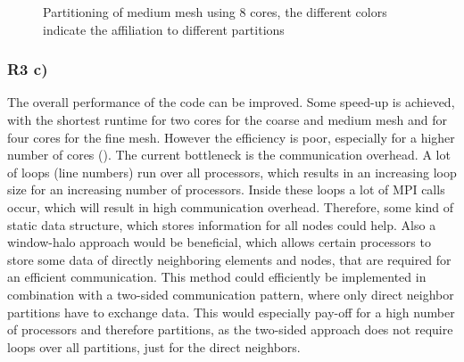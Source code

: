 \begin{figure}[h!]
	\centering
	\caption{\label{fig::partition} Partitioning of medium mesh using 8 cores, the different colors indicate the affiliation to different partitions}
\end{figure}

\subsubsection{R3 c)}

The overall performance of the code can be improved. Some speed-up is achieved, with the shortest runtime for two cores for the coarse and medium mesh and for four cores for the fine mesh. However the efficiency is poor, especially for a higher number of cores (). The current bottleneck is the communication overhead. A lot of loops (line numbers) run over all processors, which results in an increasing loop size for an increasing number of processors. Inside these loops a lot of MPI calls occur, which will result in high communication overhead. Therefore, some kind of static data structure, which stores information for all nodes could help. Also a window-halo approach would be beneficial, which allows certain processors to store some data of directly neighboring elements and nodes, that are required for an efficient communication. This method could efficiently be implemented in combination with a two-sided communication pattern, where only direct neighbor partitions have to exchange data. This would especially pay-off for a high number of processors and therefore partitions, as the two-sided approach does not require loops over all partitions, just for the direct neighbors.

